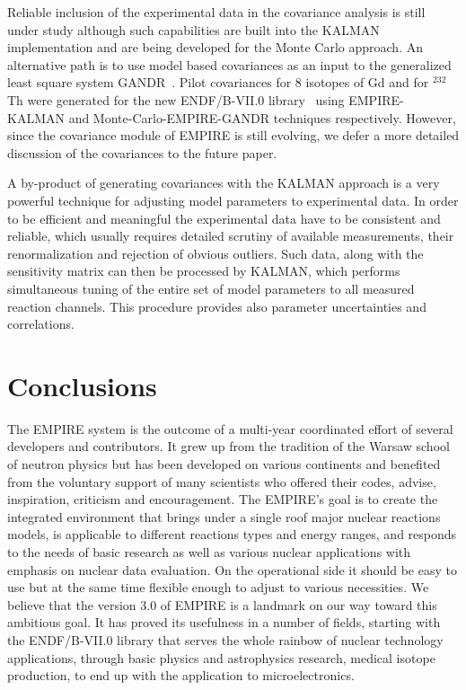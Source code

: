 \documentclass[twocolumn,amsmath,amssymb,10pt,groupedaddress,a4paper]{revtex4}
\begin{document}
Reliable inclusion of the experimental data in the covariance analysis is still under study although such capabilities are built into the KALMAN implementation and are being developed for the Monte Carlo approach.
An alternative path is to use model based covariances as an input to the generalized least square system GANDR~\cite{GANDR}. Pilot covariances for 8 isotopes of Gd and for $^{232}$Th were generated for the new ENDF/B-VII.0 library~\cite{ENDF-VII} using EMPIRE-KALMAN and Monte-Carlo-EMPIRE-GANDR techniques respectively. However, since the covariance module of EMPIRE is still evolving, we defer a more detailed discussion of the covariances to the future paper.

A by-product of generating covariances with the KALMAN approach is a very powerful technique for adjusting model parameters to experimental data. In order to be efficient and meaningful the experimental data have to be consistent and reliable, which usually requires detailed scrutiny of available measurements, their renormalization and rejection of obvious outliers. Such data, along with the sensitivity matrix can then be processed by KALMAN, which performs simultaneous tuning of the entire set of model parameters to all measured reaction channels. This procedure provides also parameter uncertainties and correlations.


\section{Conclusions}
The EMPIRE system is the outcome of a multi-year coordinated effort of several developers and contributors. It grew up from the tradition of the Warsaw school of neutron physics but has been developed on various continents and benefited from the voluntary support of many scientists who offered their codes, advise, inspiration, criticism and encouragement. The EMPIRE's goal is to create the integrated environment that brings under a single roof major nuclear reactions models, is applicable to different reactions types and energy ranges, and responds to the needs of basic research as well as various nuclear applications with emphasis on nuclear data evaluation. On the operational side it should be easy to use but at the same time flexible enough to adjust to various necessities. We believe that the version 3.0 of EMPIRE is a landmark on our way toward this ambitious goal. It has proved its usefulness in a number of fields, starting with the ENDF/B-VII.0 library that serves the whole rainbow of nuclear technology applications, through basic physics and  astrophysics research, medical isotope production, to end up with the  application to microelectronics.
\end{document}
